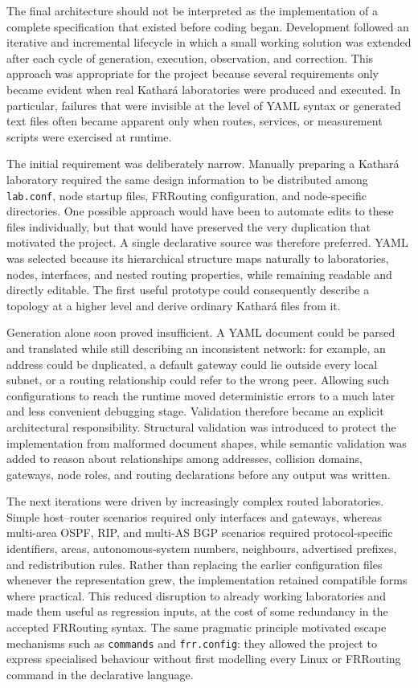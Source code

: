 The final architecture should not be interpreted as the implementation of a
complete specification that existed before coding began. Development followed
an iterative and incremental lifecycle in which a small working solution was
extended after each cycle of generation, execution, observation, and
correction. This approach was appropriate for the project because several
requirements only became evident when real Kathar\'a laboratories were produced
and executed. In particular, failures that were invisible at the level of YAML
syntax or generated text files often became apparent only when routes,
services, or measurement scripts were exercised at runtime.

The initial requirement was deliberately narrow. Manually preparing a
Kathar\'a laboratory required the same design information to be distributed
among \texttt{lab.conf}, node startup files, FRRouting configuration, and
node-specific directories. One possible approach would have been to automate
edits to these files individually, but that would have preserved the very
duplication that motivated the project. A single declarative source was
therefore preferred. YAML was selected because its hierarchical structure maps
naturally to laboratories, nodes, interfaces, and nested routing properties,
while remaining readable and directly editable. The first useful prototype
could consequently describe a topology at a higher level and derive ordinary
Kathar\'a files from it.

Generation alone soon proved insufficient. A YAML document could be parsed and
translated while still describing an inconsistent network: for example, an
address could be duplicated, a default gateway could lie outside every local
subnet, or a routing relationship could refer to the wrong peer. Allowing such
configurations to reach the runtime moved deterministic errors to a much later
and less convenient debugging stage. Validation therefore became an explicit
architectural responsibility. Structural validation was introduced to protect
the implementation from malformed document shapes, while semantic validation
was added to reason about relationships among addresses, collision domains,
gateways, node roles, and routing declarations before any output was written.

The next iterations were driven by increasingly complex routed laboratories.
Simple host--router scenarios required only interfaces and gateways, whereas
multi-area OSPF, RIP, and multi-AS BGP scenarios required protocol-specific
identifiers, areas, autonomous-system numbers, neighbours, advertised prefixes,
and redistribution rules. Rather than replacing the earlier configuration
files whenever the representation grew, the implementation retained compatible
forms where practical. This reduced disruption to already working laboratories
and made them useful as regression inputs, at the cost of some redundancy in
the accepted FRRouting syntax. The same pragmatic principle motivated escape
mechanisms such as \texttt{commands} and \texttt{frr.config}: they allowed the
project to express specialised behaviour without first modelling every Linux or
FRRouting command in the declarative language.

